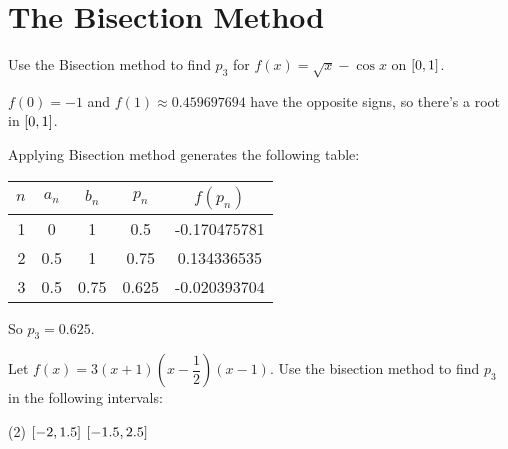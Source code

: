 \documentclass[../../../../Assignments.tex]{subfiles}
\begin{document}
\section{The Bisection Method}

\begin{exercise}
    Use the Bisection method to find \(p_3\) for \(f(x) = \sqrt{x} - \cos{x}\) on \(\interval{0}{1}\).
\end{exercise}

\begin{solution}
    \(f(0) = -1\) and \(f(1) \approx \num{0.459697694}\) have the opposite
    signs, so there's a root in \(\interval{0}{1}\).

    Applying Bisection method generates the following table:

    \begin{table}[H]    %
        \centering
        \begin{tabular}{r S[table-format=1.1] S[table-format=1.2] S[table-format=1.3] S[table-format=-1.9]}
            \toprule
            \(n\)  &  {\(a_n\)}  &  {\(b_n\)}  &  {\(p_n\)}  &  {\(f(p_n)\)}  \\
              &  0          &  1          &  0.5        &  -0.170475781  \\
                2  &  0.5        &  1          &  0.75       &   0.134336535  \\
                3  &  0.5        &  0.75       &  0.625      &  -0.020393704  \\
            \bottomrule
        \end{tabular}
    \end{table}

    So \(p_3 = \num{0.625}\).
\end{solution}

\begin{exercise}
    Let \(f(x) = 3 (x + 1) (x - \dfrac{1}{2}) (x - 1)\). Use the bisection
    method to find \(p_3\) in the following intervals:

    \begin{tasks}(2)
        \task \(\interval{-2}{\num{1.5}}\)
        \task \(\interval{\num{-1.5}}{\num{2.5}}\)
    \end{tasks}
\end{exercise}
\end{document}
